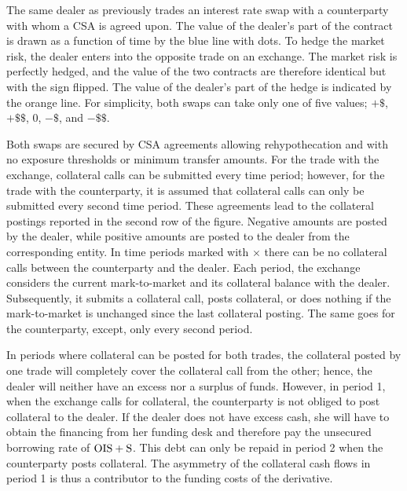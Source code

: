 \documentclass[main.tex]{subfiles}
\begin{document}
        \begin{example}
        The same dealer as previously trades an interest rate swap with a counterparty with whom a CSA is agreed upon. 
        The value of the dealer's part of the contract is drawn as a function of time 
        by the \textcolor{wtf-blue}{blue line} with dots.
        To hedge the market risk, the dealer enters into the opposite trade on an exchange.
        The market risk is perfectly hedged, 
        and the value of the two contracts are therefore identical but with the sign flipped.
        The value of the dealer's part of the hedge is indicated by the \textcolor{wtf-orange}{orange line}.
        For simplicity, both swaps can take only one of five values; $+\$$, $+\$\$$, $0$, $-\$$, and $-\$\$$.

        Both swaps are secured by CSA agreements allowing rehypothecation 
        and with no exposure thresholds or minimum transfer amounts.
        For the trade with the exchange, collateral calls can be submitted every time period;
        however, for the trade with the counterparty, it is assumed that
        collateral calls can only be submitted every second time period.
        These agreements lead to the collateral postings reported in the second row of the figure.
        Negative amounts are posted by the dealer, while positive amounts are posted to the dealer 
        from the corresponding entity.
        In time periods marked with $\boldsymbol{\times}$ 
        there can be no collateral calls between the counterparty and the dealer.
        Each period, the exchange considers the current mark-to-market and its collateral balance with the dealer.
        Subsequently, it submits a collateral call, posts collateral, 
        or does nothing if the mark-to-market is unchanged since the last collateral posting.
        The same goes for the counterparty, except, only every second period.

        In periods where collateral can be posted for both trades, 
        the collateral posted by one trade will completely cover the collateral call from the other;
        hence, the dealer will neither have an excess nor a surplus of funds.
        However, in period 1, when the exchange calls for collateral,
        the counterparty is not obliged to post collateral to the dealer. 
        If the dealer does not have excess cash, 
        she will have to obtain the financing from her funding desk
        and therefore pay the unsecured borrowing rate of $\OIS/ + \text{S}$. 
        This debt can only be repaid in period 2 when the counterparty posts collateral.
        The asymmetry of the collateral cash flows in period 1
        is thus a contributor to the funding costs of the derivative.


\end{example}
\end{document}
